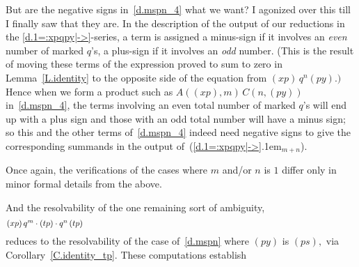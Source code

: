 \documentclass{amsart}
\begin{document}
But are the negative signs in~\eqref{d.mspn_4} what we want?
I agonized over this till I finally saw that they are.
In the description of the output of our reductions
in the \eqref{d.1=:xpqpy|->}-series, a term is assigned
a minus-sign if it involves an {\em even} number of marked $\!q\!$'s,
a plus-sign if it involves an {\em odd} number.
(This is the result of moving these terms of the expression proved
to sum to zero in Lemma~\ref{L.identity} to the opposite
side of the equation from $(xp)\,q^n (py).)$
Hence when we form a product such as
$A((xp),m)\,C(n,(py))$ in~\eqref{d.mspn_4},
the terms involving an even total number of marked $\!q\!$'s
will end up with a plus sign and those with an odd total number
will have a minus sign; so this and the other terms of~\eqref{d.mspn_4}
indeed need negative signs to give the corresponding
summands in the output of~({{\setlength{\mathsurround}{0em}\ref{d.1=:xpqpy|->}\kern.1em$_{{m+n}}$}}).

Once again, the verifications of the cases where $m$ and/or $n$ is
$1$ differ only in minor formal details from the above.

And the resolvability of the one remaining sort of ambiguity,
\begin{equation}\begin{minipage}[c]{35pc}\label{d.mspn+}
$(xp)\,q^m\cdot(tp)\cdot q^n\,(tp)$
\end{minipage}\end{equation}
reduces to the resolvability
of the case of~\eqref{d.mspn} where $(py)$ is $(ps),$
via Corollary~\ref{C.identity_tp}.
These computations establish
\end{document}
